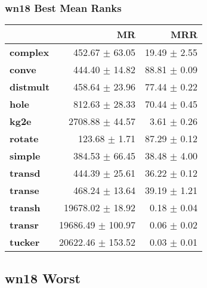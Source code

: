 \documentclass{article}
\begin{document}
\subsubsection{wn18 Best Mean Ranks}
    \begin{center}
    \begin{tabular}{lrr}
\toprule
{} &                 MR &           MRR \\
\midrule
\textbf{complex } &     452.67 $\pm$ 63.05 &  19.49 $\pm$ 2.55 \\
\textbf{conve   } &     444.40 $\pm$ 14.82 &  88.81 $\pm$ 0.09 \\
\textbf{distmult} &     458.64 $\pm$ 23.96 &  77.44 $\pm$ 0.22 \\
\textbf{hole    } &     812.63 $\pm$ 28.33 &  70.44 $\pm$ 0.45 \\
\textbf{kg2e    } &    2708.88 $\pm$ 44.57 &   3.61 $\pm$ 0.26 \\
\textbf{rotate  } &      123.68 $\pm$ 1.71 &  87.29 $\pm$ 0.12 \\
\textbf{simple  } &     384.53 $\pm$ 66.45 &  38.48 $\pm$ 4.00 \\
\textbf{transd  } &     444.39 $\pm$ 25.61 &  36.22 $\pm$ 0.12 \\
\textbf{transe  } &     468.24 $\pm$ 13.64 &  39.19 $\pm$ 1.21 \\
\textbf{transh  } &   19678.02 $\pm$ 18.92 &   0.18 $\pm$ 0.04 \\
\textbf{transr  } &  19686.49 $\pm$ 100.97 &   0.06 $\pm$ 0.02 \\
\textbf{tucker  } &  20622.46 $\pm$ 153.52 &   0.03 $\pm$ 0.01 \\
\bottomrule
\end{tabular}

    \end{center}
\subsection{wn18 Worst}
\end{document}
